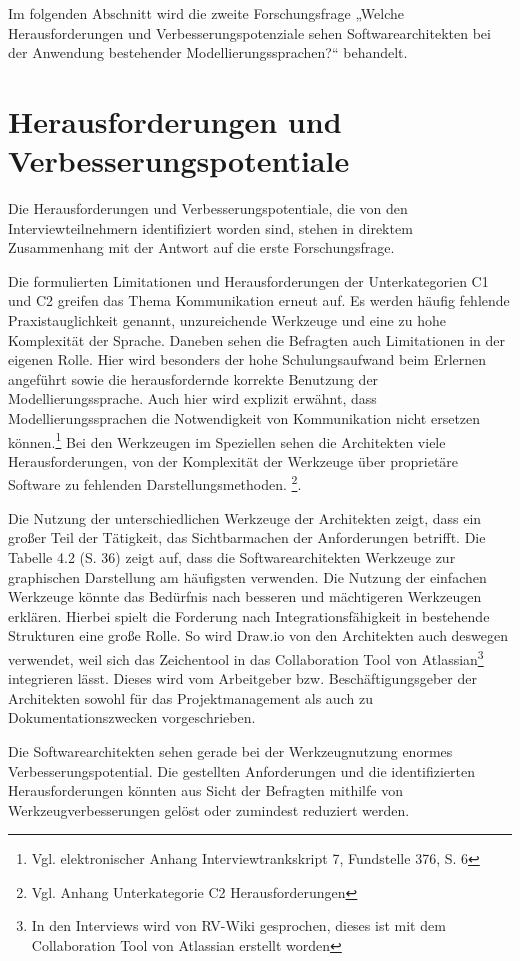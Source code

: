 Im folgenden Abschnitt wird die zweite Forschungsfrage „Welche Herausforderungen und Verbesserungspotenziale sehen Softwarearchitekten bei der Anwendung bestehender Modellierungssprachen?“ behandelt.

\section{Herausforderungen und Verbesserungspotentiale}
Die Herausforderungen und Verbesserungspotentiale, die von den Interviewteilnehmern identifiziert worden sind, stehen in direktem Zusammenhang mit der Antwort auf die erste Forschungsfrage. 

Die formulierten Limitationen und Herausforderungen der Unterkategorien C1 und C2 greifen das Thema Kommunikation erneut auf. Es werden häufig fehlende Praxistauglichkeit genannt, unzureichende Werkzeuge und eine zu hohe Komplexität der Sprache. Daneben sehen die Befragten auch Limitationen in der eigenen Rolle. Hier wird besonders der hohe Schulungsaufwand beim Erlernen angeführt sowie die herausfordernde korrekte Benutzung der Modellierungssprache. Auch hier wird explizit erwähnt, dass Modellierungssprachen die Notwendigkeit von Kommunikation nicht ersetzen können.\footnote{Vgl. elektronischer Anhang Interviewtrankskript 7, Fundstelle 376, S. 6 }
Bei den Werkzeugen im Speziellen sehen die Architekten viele Herausforderungen, von der Komplexität der Werkzeuge über proprietäre Software zu fehlenden Darstellungsmethoden. \footnote{Vgl. Anhang Unterkategorie C2 Herausforderungen}.

Die Nutzung der unterschiedlichen Werkzeuge der Architekten zeigt, dass ein großer Teil der Tätigkeit, das Sichtbarmachen der Anforderungen betrifft. Die Tabelle 4.2 (S. 36) zeigt auf, dass die Softwarearchitekten Werkzeuge zur graphischen Darstellung am häufigsten verwenden. Die Nutzung der einfachen Werkzeuge könnte das Bedürfnis nach besseren und mächtigeren Werkzeugen erklären. Hierbei spielt die Forderung nach Integrationsfähigkeit in bestehende Strukturen eine große Rolle. So wird Draw.io von den Architekten auch deswegen verwendet, weil sich das Zeichentool in das Collaboration Tool von Atlassian\footnote{In den Interviews wird von RV-Wiki gesprochen, dieses ist mit dem Collaboration Tool von Atlassian erstellt worden} integrieren lässt. Dieses wird vom Arbeitgeber bzw. Beschäftigungsgeber der Architekten sowohl für das Projektmanagement als auch zu Dokumentationszwecken vorgeschrieben.

Die Softwarearchitekten sehen gerade bei der Werkzeugnutzung enormes Verbesserungspotential. Die gestellten Anforderungen und die identifizierten Herausforderungen könnten aus Sicht der Befragten mithilfe von Werkzeugverbesserungen gelöst oder zumindest reduziert werden. 

